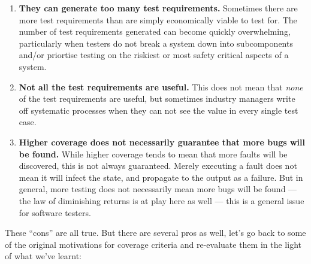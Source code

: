 \begin{enumerate}
    \item {\bf They can generate too many test requirements.} Sometimes there
    are more test requirements than are simply economically viable to test for.
    The number of test requirements generated can become quickly overwhelming,
    particularly when testers do not break a system down into subcomponents
    and/or priortise testing on the riskiest or most safety critical aspects of 
    a system.
    
    \item {\bf Not all the test requirements are useful.} This does not mean
    that {\it none} of the test requirements are useful, but sometimes industry
    managers write off systematic processes when they can not see the value in
    every single test case.

    \item {\bf Higher coverage does not necessarily guarantee that more bugs will be
    found.} While higher coverage tends to mean that more faults will be discovered,
    this is not always guaranteed. Merely executing a fault does not mean it will
    infect the state, and propagate to the output as a failure. 
    But in general, more testing does not necessarily mean more bugs will be found
    --- the law of diminishing returns is at play here as well --- this is a general
    issue for software testers. 
\end{enumerate}

These ``cons'' are all true. But there are several pros as well, let's go back to
some of the original motivations for coverage criteria and re-evaluate them in
the light of what we've learnt:

